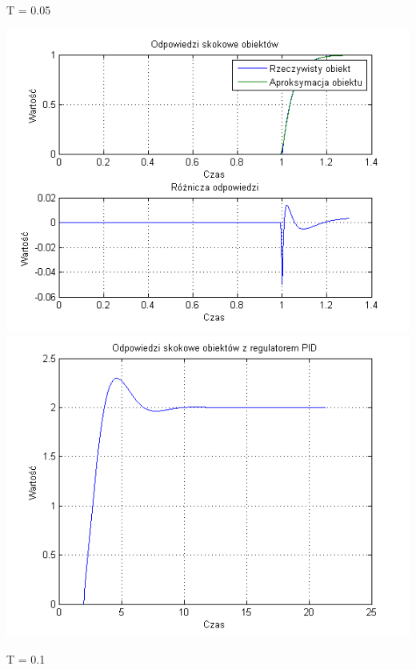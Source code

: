 \documentclass[10pt,a4paper]{article}
\begin{document}
\newpage
T = 0.05
\begin{center}
\includegraphics[scale=1]{images/dwa/skrypt_03.png}\\
\includegraphics[scale=1]{images/dwa/skrypt_04.png}\\
\end{center}
\newpage
T = 0.1
\end{document}
